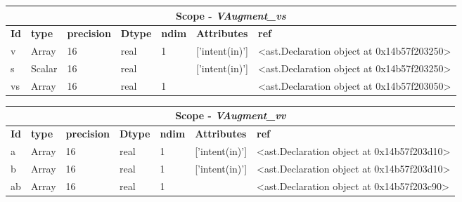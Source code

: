 \documentclass{report}
\begin{document}
\begin{center}
\begin{longtable}{|p{3.5cm}|p{1.5cm}|p{1.5cm}|p{1.5cm}|p{1cm}|p{2cm}|p{4cm}| }
\hline
\multicolumn{7}{|c|}{\textbf{Scope} -  \textbf{\textit{VAugment\_vs}}} \\ 
\hline
\textbf{Id} & \textbf{type} & \textbf{precision} & \textbf{Dtype} & \textbf{ndim} & \textbf{Attributes} & \textbf{ref} \\\hline

v & Array & 16 & real & 1 & ['intent(in)'] & <ast.Declaration object at 0x14b57f203250> \\\hline

s & Scalar & 16 & real &  & ['intent(in)'] & <ast.Declaration object at 0x14b57f203250> \\\hline

vs & Array & 16 & real & 1 &  & <ast.Declaration object at 0x14b57f203050> \\\hline

\end{longtable}
\end{center}

 \vspace{1cm}

\begin{center}
\begin{longtable}{|p{3.5cm}|p{1.5cm}|p{1.5cm}|p{1.5cm}|p{1cm}|p{2cm}|p{4cm}| }
\hline
\multicolumn{7}{|c|}{\textbf{Scope} -  \textbf{\textit{VAugment\_vv}}} \\ 
\hline
\textbf{Id} & \textbf{type} & \textbf{precision} & \textbf{Dtype} & \textbf{ndim} & \textbf{Attributes} & \textbf{ref} \\\hline

a & Array & 16 & real & 1 & ['intent(in)'] & <ast.Declaration object at 0x14b57f203d10> \\\hline

b & Array & 16 & real & 1 & ['intent(in)'] & <ast.Declaration object at 0x14b57f203d10> \\\hline

ab & Array & 16 & real & 1 &  & <ast.Declaration object at 0x14b57f203c90> \\\hline

\end{longtable}
\end{center}

 \vspace{1cm}
\end{document}
